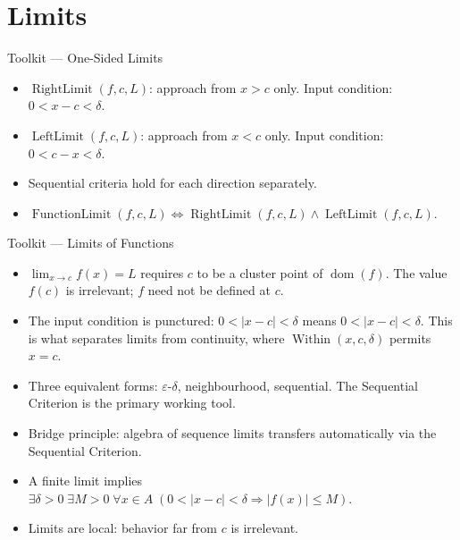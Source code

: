 
\section{Limits}

\begin{toolkitbox}{Toolkit --- One-Sided Limits}
\begin{itemize}
  \item $\operatorname{RightLimit}(f,c,L)$: approach from $x>c$ only.
    Input condition: $0<x-c<\delta$.
  \item $\operatorname{LeftLimit}(f,c,L)$: approach from $x<c$ only.
    Input condition: $0<c-x<\delta$.
  \item Sequential criteria hold for each direction separately.
  \item $\operatorname{FunctionLimit}(f,c,L)\iff
    \operatorname{RightLimit}(f,c,L)\wedge\operatorname{LeftLimit}(f,c,L)$.
\end{itemize}
\end{toolkitbox}


\begin{toolkitbox}{Toolkit --- Limits of Functions}
\begin{itemize}
  \item $\lim_{x \to c} f(x) = L$ requires $c$ to be a cluster point
    of $\operatorname{dom}(f)$. The value $f(c)$ is irrelevant;
    $f$ need not be defined at $c$.
  \item The input condition is punctured:
    $0<|x-c|<\delta$ means
    $0 < |x-c| < \delta$. This is what separates limits from
    continuity, where $\operatorname{Within}(x,c,\delta)$
    permits $x = c$.
  \item Three equivalent forms: $\varepsilon$-$\delta$, neighbourhood,
    sequential. The Sequential Criterion is the primary working tool.
  \item Bridge principle: algebra of sequence limits transfers
    automatically via the Sequential Criterion.
  \item A finite limit implies $\exists\delta>0\;\exists M>0\;\forall x\in A\;(0<|x-c|<\delta\Rightarrow |f(x)|\leq M)$.
  \item Limits are local: behavior far from $c$ is irrelevant.
\end{itemize}
\end{toolkitbox}


